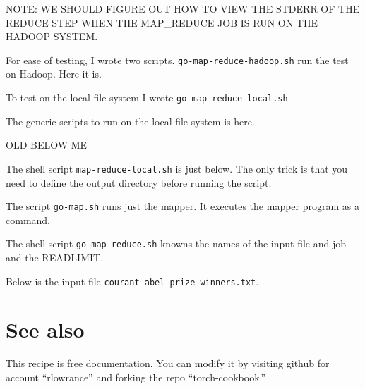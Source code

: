 \documentclass{article}
\let\code\texttt %
\begin{document}
NOTE: WE SHOULD FIGURE OUT HOW TO VIEW THE STDERR OF THE REDUCE STEP
WHEN THE MAP\_REDUCE JOB IS RUN ON THE HADOOP SYSTEM.



For ease of testing, I wrote two scripts. \code{go-map-reduce-hadoop.sh}
run the test on Hadoop. Here it is.



To test on the local file system I wrote \code{go-map-reduce-local.sh}.



The generic scripts to run on the local file system is here.


OLD BELOW ME

The shell script \code{map-reduce-local.sh} is just below. The only
trick is that you need to define the output directory before running the
script.



The script \code{go-map.sh} runs just
the mapper. It executes the mapper program as a command.



The shell script \code{go-map-reduce.sh} knowns the names of the input
file and job and the READLIMIT.




Below is the input file \code{courant-abel-prize-winners.txt}.



\section{See also}

This recipe is free documentation. You can modify it by visiting
github for account ``rlowrance'' and forking the repo
``torch-cookbook.''
\end{document}
